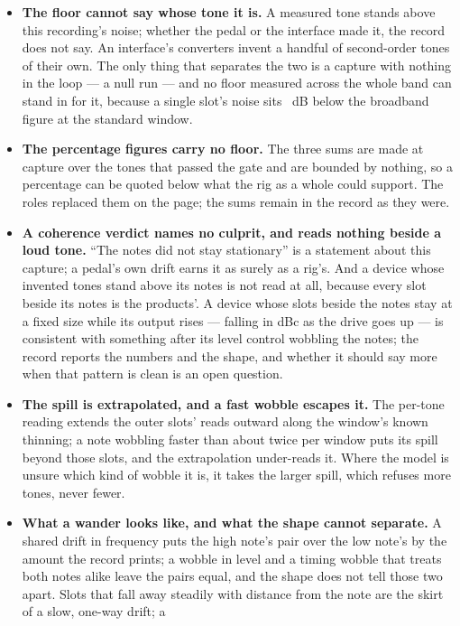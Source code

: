 \documentclass[11pt,a4paper]{article}
\begin{document}
\begin{itemize}
  \item \textbf{The floor cannot say whose tone it is.} A measured tone
  stands above this recording's noise; whether the pedal or the interface
  made it, the record does not say. An interface's converters invent a
  handful of second-order tones of their own. The only thing that
  separates the two is a capture with nothing in the loop --- a null run
  --- and no floor measured across the whole band can stand in for it,
  because a single slot's noise sits \iparityPerBinLong{}~dB below the
  broadband figure at the standard window.
  \item \textbf{The percentage figures carry no floor.} The three sums are
  made at capture over the tones that passed the gate and are bounded by
  nothing, so a percentage can be quoted below what the rig as a whole
  could support. The roles replaced them on the page; the sums remain in
  the record as they were.
  \item \textbf{A coherence verdict names no culprit, and reads nothing
  beside a loud tone.} ``The notes did not stay stationary'' is a
  statement about this capture; a pedal's own drift earns it as surely
  as a rig's. And a device whose invented tones stand above its notes is
  not read at all, because every slot beside its notes is the products'.
  A device whose slots beside the notes stay at a fixed size while its
  output rises --- falling in dBc as the drive goes up --- is consistent
  with something after its level control wobbling the notes; the record
  reports the numbers and the shape, and whether it should say more when
  that pattern is clean is an open question.
  \item \textbf{The spill is extrapolated, and a fast wobble escapes
  it.} The per-tone reading extends the outer slots' reads outward along
  the window's known thinning; a note wobbling faster than about twice
  per window puts its spill beyond those slots, and the extrapolation
  under-reads it. Where the model is unsure which kind of wobble it is,
  it takes the larger spill, which refuses more tones, never fewer.
  \item \textbf{What a wander looks like, and what the shape cannot
  separate.} A shared drift in frequency puts the high note's pair over
  the low note's by the amount the record prints; a wobble in level and a
  timing wobble that treats both notes alike leave the pairs equal, and
  the shape does not tell those two apart. Slots that fall away steadily
  with distance from the note are the skirt of a slow, one-way drift; a

\end{itemize}
\end{document}
